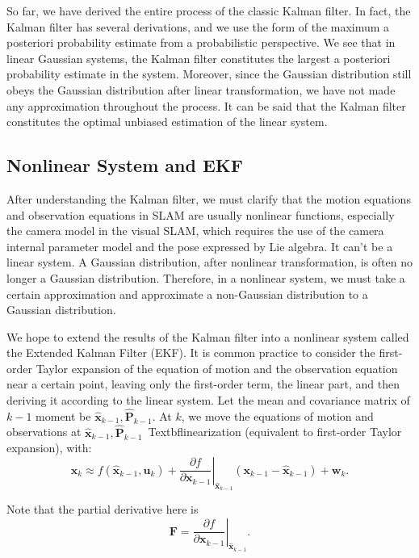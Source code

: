 So far, we have derived the entire process of the classic Kalman filter. In fact, the Kalman filter has several derivations, and we use the form of the maximum a posteriori probability estimate from a probabilistic perspective. We see that in linear Gaussian systems, the Kalman filter constitutes the largest a posteriori probability estimate in the system. Moreover, since the Gaussian distribution still obeys the Gaussian distribution after linear transformation, we have not made any approximation throughout the process. It can be said that the Kalman filter constitutes the optimal unbiased estimation of the linear system.

\subsection{Nonlinear System and EKF}
After understanding the Kalman filter, we must clarify that the motion equations and observation equations in SLAM are usually nonlinear functions, especially the camera model in the visual SLAM, which requires the use of the camera internal parameter model and the pose expressed by Lie algebra. It can't be a linear system. A Gaussian distribution, after nonlinear transformation, is often no longer a Gaussian distribution. Therefore, in a nonlinear system, we must take a certain approximation and approximate a non-Gaussian distribution to a Gaussian distribution.

We hope to extend the results of the Kalman filter into a nonlinear system called the Extended Kalman Filter (EKF). It is common practice to consider the first-order Taylor expansion of the equation of motion and the observation equation near a certain point, leaving only the first-order term, the linear part, and then deriving it according to the linear system. Let the mean and covariance matrix of $k-1$ moment be $\bm{\hat{x}}_{k-1},\bm{\hat{P}}_{k-1}$. At $k$, we move the equations of motion and observations at $\bm{\hat{x}}_{k-1},\bm{\hat{P}}_{k-1}$\ Textbf{linearization} (equivalent to first-order Taylor expansion), with:
\begin{equation}
{\bm{x}_k} \approx f\left( {{{\bm{\hat x}}_{k - 1}},{\bm{u}_k}} \right) + {\left. {\frac{{\partial f}}{{\partial {\bm{x}_{k - 1}}}}} \right|_{{{\bm{\hat x}}_{k - 1}}}}\left( {{\bm{x}_{k - 1}} - {{\bm{\hat x}}_{k - 1}}} \right) + {\bm{w}_k}.
\end{equation}

Note that the partial derivative here is
\begin{equation}
\bm{F} = \left. {\frac{{\partial f}}{{\partial {\bm{x}_{k - 1}}}}} \right|_{{{\bm{\hat x}}_{k - 1}}}.
\end{equation}


